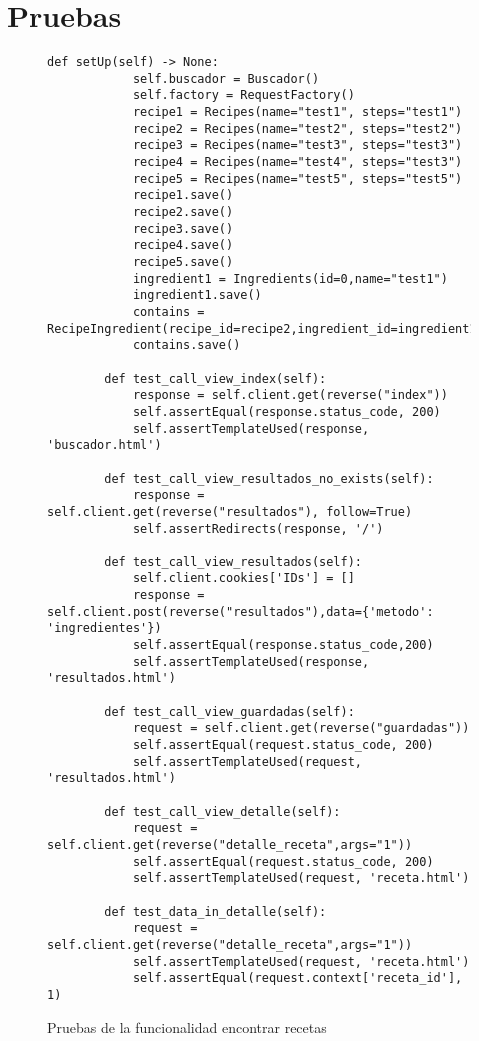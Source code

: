 \chapter{Pruebas}
\begin{figure}[H]
    \begin{lstlisting}[style=consola]
        def setUp(self) -> None:
            self.buscador = Buscador()
            self.factory = RequestFactory()
            recipe1 = Recipes(name="test1", steps="test1")
            recipe2 = Recipes(name="test2", steps="test2")
            recipe3 = Recipes(name="test3", steps="test3")
            recipe4 = Recipes(name="test4", steps="test3")
            recipe5 = Recipes(name="test5", steps="test5")
            recipe1.save()
            recipe2.save()
            recipe3.save()
            recipe4.save()
            recipe5.save()
            ingredient1 = Ingredients(id=0,name="test1")
            ingredient1.save()
            contains = RecipeIngredient(recipe_id=recipe2,ingredient_id=ingredient1)
            contains.save()
    
        def test_call_view_index(self):
            response = self.client.get(reverse("index"))
            self.assertEqual(response.status_code, 200)
            self.assertTemplateUsed(response, 'buscador.html')
        
        def test_call_view_resultados_no_exists(self):
            response = self.client.get(reverse("resultados"), follow=True)
            self.assertRedirects(response, '/')
    
        def test_call_view_resultados(self):
            self.client.cookies['IDs'] = []
            response = self.client.post(reverse("resultados"),data={'metodo': 'ingredientes'})
            self.assertEqual(response.status_code,200)
            self.assertTemplateUsed(response, 'resultados.html')
    
        def test_call_view_guardadas(self):
            request = self.client.get(reverse("guardadas"))
            self.assertEqual(request.status_code, 200)
            self.assertTemplateUsed(request, 'resultados.html')
    
        def test_call_view_detalle(self):
            request = self.client.get(reverse("detalle_receta",args="1"))
            self.assertEqual(request.status_code, 200)
            self.assertTemplateUsed(request, 'receta.html')
    
        def test_data_in_detalle(self):
            request = self.client.get(reverse("detalle_receta",args="1"))
            self.assertTemplateUsed(request, 'receta.html')
            self.assertEqual(request.context['receta_id'], 1)
\end{lstlisting}
    \caption{Pruebas de la funcionalidad encontrar recetas}
    \label{sni:test}
\end{figure}

